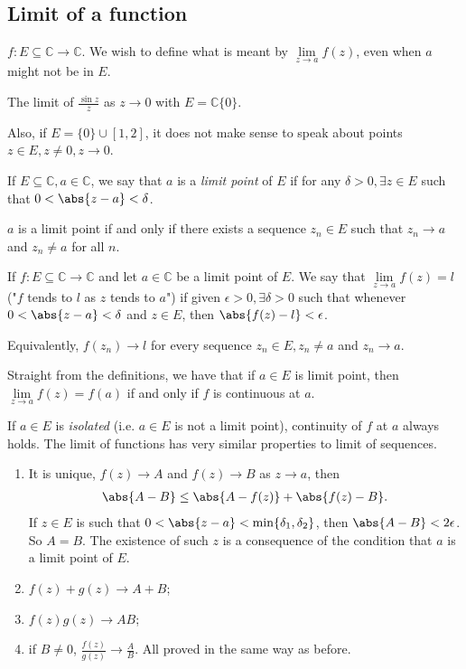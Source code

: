 \subsection{Limit of a function}
\(f:E\subseteq \mathbb{C} \to \mathbb{C}\). We wish to define what is meant by \(\lim\limits_{z \to a} f(z)\), even when \(a\) might not be in \(E\).
\begin{example}
    The limit of \(\frac{\sin z}{z}\) as \(z \to 0\) with \(E = \mathbb{C}\{0\}\).

    Also, if \(E = \{0\}\cup [1,2]\), it does not make sense to speak about points \(z\in E, z\neq 0, z\to 0\).
\end{example}
\begin{definition}{}{}
    If \(E \subseteq \mathbb{C}, a \in \mathbb{C}\), we say that \(a\) is a \textit{limit point} of \(E\) if for any \(\delta>0,\exists z \in E\) such that \(0< \abs{z - a} < \delta\).
\end{definition}
\begin{remark}
    \(a\) is a limit point if and only if there exists a sequence \(z_n \in E\) such that \(z_n \to a\) and \(z_n \neq a\) for all \(n\).
\end{remark}
\begin{definition}{}{}
    If \(f: E \subseteq \mathbb{C}\to \mathbb{C}\) and let \(a\in \mathbb{C}\) be a limit point of \(E\). We say that \(\lim\limits_{z \to a} f(z) = l\) ("\(f\) tends to \(l\) as \(z\) tends to \(a\)") if given \(\epsilon>0, \exists \delta>0\) such that whenever \(0 < \abs{z-a} < \delta\) and \(z \in E\), then \(\abs{f(z) - l} < \epsilon\).

    Equivalently,  \(f(z_n) \to l\) for every sequence \(z_n \in E, z_n \neq a\) and \(z_n \to a\).
\end{definition}
\begin{remark}
    Straight from the definitions, we have that if \(a \in E\) is limit point, then \(\lim\limits_{z \to a} f(z) = f(a)\) if and only if \(f\) is continuous at \(a\).

    If \(a\in E\) is \textit{isolated}  (i.e. \(a\in E\) is not a limit point), continuity of \(f\) at \(a\) always holds.
The limit of functions has very similar properties to limit of sequences.
\begin{enumerate}
    \item It is unique, \(f(z) \to A\) and \(f(z) \to B\) as \(z \to a\), then
    \begin{align*}
        \abs{A-B} \leq \abs{A-f(z)} + \abs{f(z) - B}.
    \end{align*}
    If \(z\in E\) is such that \(0 < \abs{z-a} < \min\{\delta_1, \delta_2\}\), then \(\abs{A-B} < 2\epsilon\). So \(A = B\). The existence of such \(z\) is a consequence of the condition that \(a\) is a limit point of \(E\).
    \item \(f(z) + g(z) \to A + B\);
    \item \(f(z) g(z) \to AB\);
    \item if \(B \neq 0\), \(\frac{f(z)}{g(z)}\to \frac{A}{B}\). All proved in the same way as before.
\end{enumerate}
\end{remark}
